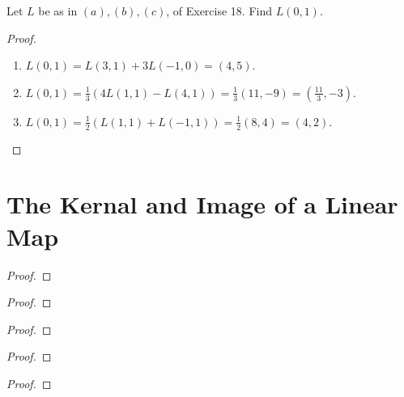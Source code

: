 \begin{exercise}
    Let $L$ be as in $(a), (b), (c)$, of Exercise 18. Find $L(0, 1)$.
\end{exercise}

\begin{proof}
    \begin{enumerate}[label={(\alph*)}]
        \item $L(0, 1) = L(3, 1) + 3L(-1, 0) = (4, 5)$.
        \item $L(0, 1) = \frac{1}{3}(4L(1, 1) - L(4, 1)) = \frac{1}{3}(11, -9) = (\frac{11}{3}, -3)$.
        \item $L(0, 1) = \frac{1}{2}(L(1, 1) + L(-1, 1)) = \frac{1}{2}(8, 4) = (4, 2)$.
    \end{enumerate}
\end{proof}

\section{The Kernal and Image of a Linear Map}
\setcounter{exercise}{0}

\begin{exercise}
\end{exercise}

\begin{proof}
\end{proof}

\begin{exercise}
\end{exercise}

\begin{proof}
\end{proof}

\begin{exercise}
\end{exercise}

\begin{proof}
\end{proof}

\begin{exercise}
\end{exercise}

\begin{proof}
\end{proof}

\begin{exercise}
\end{exercise}

\begin{proof}
\end{proof}

